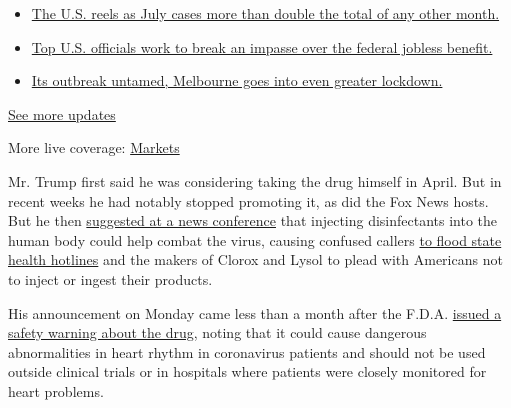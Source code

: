 \begin{itemize}
\tightlist
\item
  \href{https://www.nytimes3xbfgragh.onion/2020/08/01/world/coronavirus-covid-19.html?action=click\&pgtype=Article\&state=default\&region=MAIN_CONTENT_1\&context=storylines_live_updates\#link-34047410}{The
  U.S. reels as July cases more than double the total of any other
  month.}
\item
  \href{https://www.nytimes3xbfgragh.onion/2020/08/01/world/coronavirus-covid-19.html?action=click\&pgtype=Article\&state=default\&region=MAIN_CONTENT_1\&context=storylines_live_updates\#link-780ec966}{Top
  U.S. officials work to break an impasse over the federal jobless
  benefit.}
\item
  \href{https://www.nytimes3xbfgragh.onion/2020/08/01/world/coronavirus-covid-19.html?action=click\&pgtype=Article\&state=default\&region=MAIN_CONTENT_1\&context=storylines_live_updates\#link-2bc8948}{Its
  outbreak untamed, Melbourne goes into even greater lockdown.}
\end{itemize}

\href{https://www.nytimes3xbfgragh.onion/2020/08/01/world/coronavirus-covid-19.html?action=click\&pgtype=Article\&state=default\&region=MAIN_CONTENT_1\&context=storylines_live_updates}{See
more updates}

More live coverage:
\href{https://www.nytimes3xbfgragh.onion/live/2020/07/31/business/stock-market-today-coronavirus?action=click\&pgtype=Article\&state=default\&region=MAIN_CONTENT_1\&context=storylines_live_updates}{Markets}

Mr. Trump first said he was considering taking the drug himself in
April. But in recent weeks he had notably stopped promoting it, as did
the Fox News hosts. But he then
\href{https://www.nytimes3xbfgragh.onion/2020/04/26/us/politics/trump-disinfectant-coronavirus.html}{suggested
at a news conference} that injecting disinfectants into the human body
could help combat the virus, causing confused callers
\href{https://slack-redir.net/link?url=https\%3A\%2F\%2Fwww.nytimes3xbfgragh.onion\%2F2020\%2F04\%2F24\%2Fus\%2Fpolitics\%2Ftrump-inject-disinfectant-bleach-coronavirus.html}{to
flood state health hotlines} and the makers of Clorox and Lysol to plead
with Americans not to inject or ingest their products.

His announcement on Monday came less than a month after the F.D.A.
\href{https://www.nytimes3xbfgragh.onion/2020/04/24/health/fda-hydroxychloroquine-coronavirus.html?smid=nytcore-ios-share}{issued
a safety warning about the drug}, noting that it could cause dangerous
abnormalities in heart rhythm in coronavirus patients and should not be
used outside clinical trials or in hospitals where patients were closely
monitored for heart problems.

